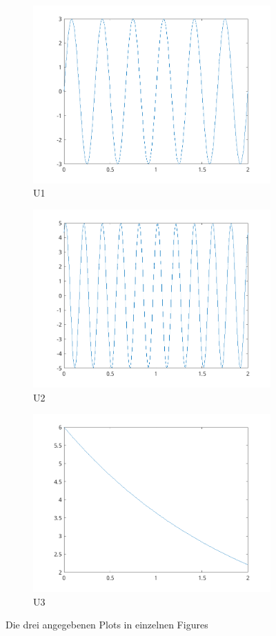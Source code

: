 \documentclass{article}
\begin{document}
\begin{figure}[!h]
  \begin{subfigure}{.33\textwidth}
    \centering
    \includegraphics[width=.8\linewidth]{../assets/images/ET2P6/u1.png}
    \caption{U1}
  \end{subfigure}
  \begin{subfigure}{.33\textwidth}
    \centering
    \includegraphics[width=.8\linewidth]{../assets/images/ET2P6/u2.png}
    \caption{U2}
  \end{subfigure}
  \begin{subfigure}{.33\textwidth}
    \centering
    \includegraphics[width=.8\linewidth]{../assets/images/ET2P6/u3.png}
    \caption{U3}
  \end{subfigure}
  \caption{Die drei angegebenen Plots in einzelnen Figures}
\end{figure}
\end{document}
